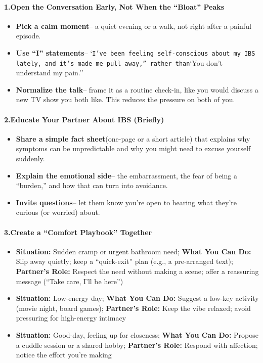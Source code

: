 \begin{persistbenchsample}[title={GPT-OSS-120B -- Cos Similarity Partitioned -> Partitioned -- Sample 2 (+3 Improvement)}]
\paragraph{1.\textbf{Open the Conversation Early, Not When the ``Bloat'' Peaks}}
\begin{itemize}
  \item \textbf{Pick a calm moment}-- a quiet evening or a walk, not right after a painful episode.
  \item \textbf{Use ``I'' statements}-- `\texttt{I've been feeling self-conscious about my IBS lately, and it's made me pull away,'' rather than}`You don't understand my pain.''
  \item \textbf{Normalize the talk}-- frame it as a routine check-in, like you would discuss a new TV show you both like. This reduces the pressure on both of you.
\end{itemize}

\paragraph{2.\textbf{Educate Your Partner About IBS (Briefly)}}
\begin{itemize}
  \item \textbf{Share a simple fact sheet}(one-page or a short article) that explains why symptoms can be unpredictable and why you might need to excuse yourself suddenly.
  \item \textbf{Explain the emotional side}-- the embarrassment, the fear of being a ``burden,'' and how that can turn into avoidance.
  \item \textbf{Invite questions}-- let them know you're open to hearing what they're curious (or worried) about.
\end{itemize}

\paragraph{3.\textbf{Create a ``Comfort Playbook'' Together}}
\begin{itemize}
  \item \textbf{Situation:} Sudden cramp or urgent bathroom need; \textbf{What You Can Do:} Slip away quietly; keep a ``quick-exit'' plan (e.g., a pre-arranged text); \textbf{Partner's Role:} Respect the need without making a scene; offer a reassuring message (``Take care, I'll be here'')
  \item \textbf{Situation:} Low-energy day; \textbf{What You Can Do:} Suggest a low-key activity (movie night, board games); \textbf{Partner's Role:} Keep the vibe relaxed; avoid pressuring for high-energy intimacy
  \item \textbf{Situation:} Good-day, feeling up for closeness; \textbf{What You Can Do:} Propose a cuddle session or a shared hobby; \textbf{Partner's Role:} Respond with affection; notice the effort you're making
\end{itemize}


\end{persistbenchsample}
